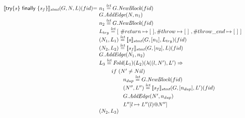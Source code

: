 \[\begin{array}{l@{}l@{~}l}
\transfun{\irtryfin{s}{s_f}}_{\emph{stmt}}(G,N,L)(fid) & = &
	n_1 \letval G.\emph{NewBlock}(fid)\\
	& & G.\emph{AddEdge}(N,n_1)\\
	& & n_2 \letval G.\emph{NewBlock}(fid)\\
	& & L_{try} \letval [\ \#return \mapsto [\ ], \#throw \mapsto [\ ]\ , \#throw\_end \mapsto [\ ]\ ] \\
	& & (N_1,L_1) \letval \transfun{s}_{\emph{stmt}}(G,[n_1],L_{try})(fid)\\
	& & (N_2,L_2) \letval \transfun{s_f}_{\emph{stmt}}(G,[n_2],L)(fid)\\ %
	& & G.\emph{AddEdge}(N_1,n_2)\\
	& & L_3 \letval \Fold(L_1)(L_2)(\lambda((l,N'),L') \Rightarrow\\
	& & \phantom{L_3 \letval}if\ (N' \neq Nil)\\
	& & \phantom{L_3 \letval \Fold} n_{dup} \letval G.\emph{NewBlock}(fid)\\
	& & \phantom{L_3 \letval \Fold} (N'',L'') \letval \transfun{s_f}_{\emph{stmt}}(G,[n_{dup}],L')(fid)\\
	& & \phantom{L_3 \letval \Fold} G.\emph{AddEdge}(N',n_{dup})\\
	& & \phantom{L_3 \letval \Fold} L''[l \mapsto L''(l)@N'']\\
	& & (N_2,L_3)\\
	& & \\
\end{array}
\]


